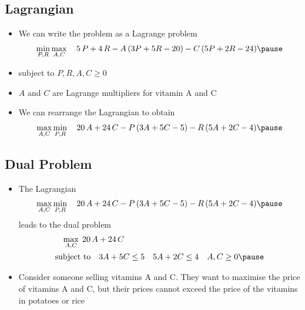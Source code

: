 
\begin{slide}
\section{Lagrangian}

\begin{PauseHighLight}
  \begin{itemize}
  \item We can write the problem as a Lagrange problem
    \begin{align*}
      \min_{P,R} \max_{A,C} \quad 5\,P + 4\,R - A\,(3 P + 5 R - 20)
      - C \, (5 P + 2 R - 24)\pause
    \end{align*}
  \item subject to $P,R,A,C \geq 0$\pause
  \item $A$ and $C$ are Lagrange multipliers for vitamin A and C\pause
  \item We can rearrange the Lagrangian to obtain
    \begin{align*}
      \max_{A,C} \min_{P,R} \quad 20\, A + 24\, C - P \, (3 A + 5 C - 5)
      - R \, (5 A + 2 C - 4)\pause
    \end{align*}
  \end{itemize}
\end{PauseHighLight}

\end{slide}



\begin{slide}
\section{Dual Problem}

\begin{PauseHighLight}
  \begin{itemize}
  \item The Lagrangian
    \begin{align*}
      \max_{A,C} \min_{P,R} \quad 20\, A + 24\, C - P \, (3 A + 5 C - 5)
      - R \, (5 A + 2 C - 4)\pause
    \end{align*}
    leads to the dual problem
    \begin{align*}
      \max_{A,C}\; 20\, A + 24\, C \hspace{6cm} \\
      \text{subject to} \quad 3 A + 5 C \leq 5 \quad 5 A + 2 C \leq 4
      \quad A, C \geq 0\pause
    \end{align*}
  \item Consider someone selling vitamins A and C.  They want
    to maximise the price of vitamins A and C, but their prices cannot
    exceed the price of the vitamins in potatoes or rice\pause
  \end{itemize}
\end{PauseHighLight}

\end{slide}

